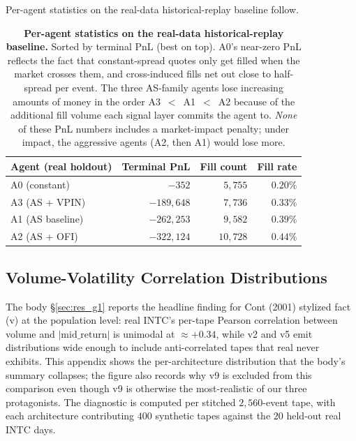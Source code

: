 \documentclass[journal]{IEEEtran}
\theoremstyle{definition}   %
\begin{document}
Per-agent statistics on the real-data historical-replay baseline
follow.

\begin{table}[ht]
    \centering
    \footnotesize
    \begin{tabular}{lrrr}
        \toprule
        Agent (real holdout) & Terminal PnL & Fill count & Fill rate \\
        \midrule
        A0 (constant)        & $-352$        & $5{,}755$  & $0.20\%$ \\
        A3 (AS + VPIN)       & $-189{,}648$  & $7{,}736$  & $0.33\%$ \\
        A1 (AS baseline)     & $-262{,}253$  & $9{,}582$  & $0.39\%$ \\
        A2 (AS + OFI)        & $-322{,}124$  & $10{,}728$ & $0.44\%$ \\
        \bottomrule
    \end{tabular}
    \caption{\textbf{Per-agent statistics on the real-data
    historical-replay baseline.} Sorted by terminal PnL (best on
    top). A0's near-zero PnL reflects the fact that constant-spread
    quotes only get filled when the market crosses them, and
    cross-induced fills net out close to half-spread per event. The
    three AS-family agents lose increasing amounts of money in the
    order A3~$<$~A1~$<$~A2 because of the additional fill volume
    each signal layer commits the agent to. \emph{None} of these
    PnL numbers includes a market-impact penalty; under impact, the
    aggressive agents (A2, then A1) would lose more.}
    \label{tab:agent_truth}
\end{table}

\subsection{Volume-Volatility Correlation Distributions}
\label{app:vol_vol}

The body \S\ref{sec:res_g1} reports the headline finding for
Cont (2001) stylized fact (v) at the population level: real INTC's
per-tape Pearson correlation between volume and
$|\text{mid\_return}|$ is unimodal at $\approx +0.34$, while v2
and v5 emit distributions wide enough to include anti-correlated
tapes that real never exhibits. This appendix shows the
per-architecture distribution that the body's summary collapses;
the figure also records why v9 is excluded from this comparison
even though v9 is otherwise the most-realistic of our three
protagonists. The diagnostic is computed per stitched
$2{,}560$-event tape, with each architecture contributing $400$
synthetic tapes against the $20$ held-out real INTC days.
\end{document}
